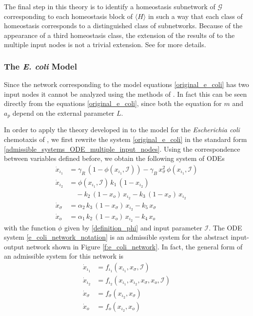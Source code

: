 \documentclass[a4paper,fleqn]{cas-dc}
\begin{document}
The final step in this theory is to identify a homeostasis subnetwork of $\mathcal{G}$ corresponding to each homeostasis block of $\langle H \rangle$ in such a way that each class of homeostasis corresponds to a distinguished class of subnetworks. 
Because of the appearance of a third homeostasis class, the extension of the results of \cite{wang2021} to the multiple input nodes is not a trivial extension.
See \cite{madeira2022} for more details.

\subsubsection{The \emph{E. coli} Model}

Since the network corresponding to the model equations \ref{original_e_coli} has two input nodes it cannot be analyzed using the methods of \cite{wang2021}. 
In fact this can be seen directly from the equations \ref{original_e_coli}, since both the equation for $m$ and $a_p$ depend on the external parameter $L$.

In order to apply the theory developed in \cite{madeira2022} to the model for the \textit{Escherichia coli} chemotaxis of \cite{edgington2018}, we first rewrite the system \eqref{original_e_coli} in the standard form \eqref{admissible_systems_ODE_multiple_input_nodes}.
Using the correspondence between variables defined before, we obtain the following system of ODEs
\begin{equation} \label{e_coli_network_notation}
\begin{aligned}
\dot{x}_{\iota_1} & = \gamma_{R}  \, (1 - \phi(x_{\iota_1}, \mathcal{I})) - \gamma_{B} \, x_{\sigma}^{2} \, \phi(x_{\iota_1}, \mathcal{I}) \\
\dot{x}_{\iota_{2}} & = \phi(x_{\iota_1}, \mathcal{I}) \, k_{1} \, (1 - x_{\iota_2}) \\
& \quad - k_{2} \, (1 - x_{o}) \, x_{\iota_2} - k_{3} \, (1 - x_{\sigma}) \, x_{\iota_2} \\
\dot{x}_{\sigma} & = \alpha_{2} \, k_{3} \, (1 - x_{\sigma}) \, x_{\iota_2} - k_{5} \, x_{\sigma} \\
\dot{x}_{o} & = \alpha_{1} \, k_{2} \, (1 - x_{o}) \, x_{\iota_2} - k_{4} \, x_{o}
\end{aligned}
\end{equation}
with the function $\phi$ given by \eqref{definition_phi} and input parameter $\mathcal{I}$.
The ODE system \eqref{e_coli_network_notation} is an admissible system for the abstract input-output network shown in Figure \ref{f:e_coli_network}. 
In fact, the general form of an admissible system for this network is
\begin{equation} \label{e_coli_general_admissible}
\begin{aligned}
\dot{x}_{\iota_1} & = f_{\iota_1}(x_{\iota_1},x_{\sigma},\mathcal{I}) \\
\dot{x}_{\iota_2} & = f_{\iota_2}(x_{\iota_1}, x_{\iota_2},x_{\sigma},x_{o},\mathcal{I}) \\
\dot{x}_{\sigma} & = f_{\sigma}(x_{\iota_2},x_{\sigma}) \\
\dot{x}_{o} & = f_{o}(x_{\iota_2},x_{o})
\end{aligned}
\end{equation}
\end{document}
